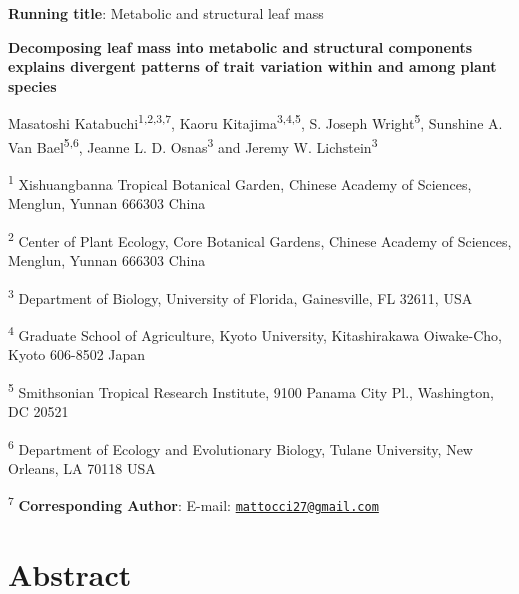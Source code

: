 \documentclass[
  12pt,
]{article}
\author{}
\date{\vspace{-2.5em}}
\begin{document}
\textbf{Running title}: Metabolic and structural leaf mass

\textbf{Decomposing leaf mass into metabolic and structural components explains divergent patterns of trait variation within and among plant species}

Masatoshi Katabuchi\textsuperscript{1,2,3,7}, Kaoru Kitajima\textsuperscript{3,4,5}, S. Joseph Wright\textsuperscript{5}, Sunshine A. Van Bael\textsuperscript{5,6}, Jeanne L. D. Osnas\textsuperscript{3} and Jeremy W. Lichstein\textsuperscript{3}

\textsuperscript{1} Xishuangbanna Tropical Botanical Garden, Chinese Academy of Sciences, Menglun, Yunnan 666303 China

\textsuperscript{2} Center of Plant Ecology, Core Botanical Gardens, Chinese Academy of Sciences, Menglun, Yunnan 666303 China

\textsuperscript{3} Department of Biology, University of Florida, Gainesville, FL 32611, USA

\textsuperscript{4} Graduate School of Agriculture, Kyoto University, Kitashirakawa Oiwake-Cho, Kyoto 606-8502 Japan

\textsuperscript{5} Smithsonian Tropical Research Institute, 9100 Panama City Pl., Washington, DC 20521

\textsuperscript{6} Department of Ecology and Evolutionary Biology, Tulane University, New Orleans, LA 70118 USA

\textsuperscript{7} \textbf{Corresponding Author}: E-mail: \href{mailto:mattocci27@gmail.com}{\nolinkurl{mattocci27@gmail.com}}

\newpage

\hypertarget{abstract}{%
\section{Abstract}\label{abstract}}
\end{document}

